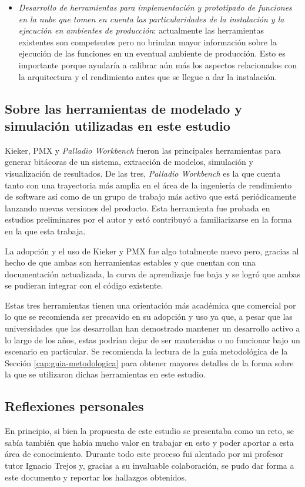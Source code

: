 \begin{itemize}
    \item \emph{Desarrollo de herramientas para implementación y prototipado de funciones en la nube que tomen en cuenta las particularidades de la instalación y la ejecución en ambientes de producción}: actualmente las herramientas existentes son competentes pero no brindan mayor información sobre la ejecución de las funciones en un eventual ambiente de producción. Esto es importante porque ayudaría a calibrar aún más los aspectos relacionados con la arquitectura y el rendimiento antes que se llegue a dar la instalación.
\end{itemize}

\subsection{Sobre las herramientas de modelado y simulación utilizadas en este estudio}
Kieker, PMX y \emph{Palladio Workbench} fueron las principales herramientas para generar bitácoras de un sistema, extracción de modelos, simulación y visualización de resultados. De las tres, \emph{Palladio Workbench} es la que cuenta tanto con una trayectoria más amplia en el área de la ingeniería de rendimiento de software así como de un grupo de trabajo más activo que está periódicamente lanzando nuevas versiones del producto. Esta herramienta fue probada en estudios preliminares por el autor y estó contribuyó a familiarizarse en la forma en la que esta trabaja.

La adopción y el uso de Kieker y PMX fue algo totalmente nuevo pero, gracias al hecho de que ambas son herramientas estables y que cuentan con una documentación actualizada, la curva de aprendizaje fue baja y se logró que ambas se pudieran integrar con el código existente.

Estas tres herramientas tienen una orientación más académica que comercial por lo que se recomienda ser precavido en su adopción y uso ya que, a pesar que las universidades que las desarrollan han demostrado mantener un desarrollo activo a lo largo de los años, estas podrían dejar de ser mantenidas o no funcionar bajo un escenario en particular. Se recomienda la lectura de la guía metodológica de la Sección \ref{cap:guia-metodologica} para obtener mayores detalles de la forma sobre la que se utilizaron dichas herramientas en este estudio.

\subsection{Reflexiones personales}
En principio, si bien la propuesta de este estudio se presentaba como un reto, se sabía también que había mucho valor en trabajar en esto y poder aportar a esta área de conocimiento. Durante todo este proceso fui alentado por mi profesor tutor Ignacio Trejos y, gracias a su invaluable colaboración, se pudo dar forma a este documento y reportar los hallazgos obtenidos.

